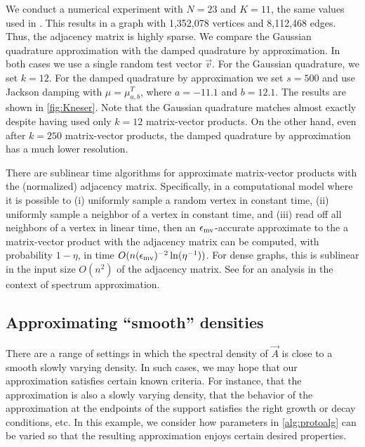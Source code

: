 We conduct a numerical experiment with \( N = 23 \) and \( K = 11 \), the same values used in \cite{large_matrices_density_review_18}.
This results in a graph with 1,352,078 vertices and 8,112,468 edges.
Thus, the adjacency matrix is highly sparse. 
We compare the Gaussian quadrature approximation with the damped quadrature by approximation. 
In both cases we use a single random test vector \( \vec{v} \).
For the Gaussian quadrature, we set \( k = 12 \).
For the damped quadrature by approximation we set \( s=500 \) and use Jackson damping with \( \mu = \mu_{a,b}^T \), where \( a = -11.1 \) and \( b=12.1 \).
The results are shown in \cref{fig:Kneser}.
Note that the Gaussian quadrature matches almost exactly despite having used only \( k=12 \) matrix-vector products. 
On the other hand, even after \( k=250 \) matrix-vector products, the damped quadrature by approximation has a much lower resolution.

\begin{remark}
There are sublinear time algorithms for approximate matrix-vector products with the (normalized) adjacency matrix.
Specifically, in a computational model where it is possible to 
(i) uniformly sample a random vertex in constant time, 
(ii) uniformly sample a neighbor of a vertex in constant time, and 
(iii) read off all neighbors of a vertex in linear time, 
then an \( \epsilon_{\textup{mv}} \)-accurate approximate to the a matrix-vector product with the adjacency matrix can be computed, with probability \( 1-\eta \), in time \( O(n (\epsilon_{\textup{mv}})^{-2}\ln(\eta^{-1})) \).
For dense graphs, this is sublinear in the input size \( O(n^2) \) of the adjacency matrix.
See \cite{braverman_krishnan_musco_22} for an analysis in the context of spectrum approximation.
\end{remark}

\subsection{Approximating ``smooth'' densities}
\label{sec:smooth_density}

There are a range of settings in which the spectral density of \( \vec{A} \) is close to a smooth slowly varying density.
In such cases, we may hope that our approximation satisfies certain known criteria. 
For instance, that the approximation is also a slowly varying density, that the behavior of the approximation at the endpoints of the support satisfies the right growth or decay conditions, etc.
In this example, we consider how parameters in \cref{alg:protoalg} can be varied so that the resulting approximation enjoys certain desired properties. 


